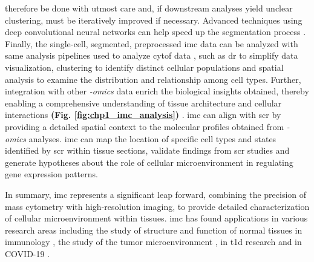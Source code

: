 therefore be done with utmost care and, if downstream analyses yield unclear clustering, must be iteratively improved if necessary. Advanced techniques using deep convolutional neural networks can help speed up the segmentation process \textbf{\cite{jung_automatic_2019,fujita_cell_2021}}. Finally, the single-cell, segmented, preprocessed \gls{imc} data can be analyzed with same analysis pipelines used to analyze \gls{cytof} data \textbf{\cite{veenstra_research_2021}}, such as \gls{dr} to simplify data visualization, clustering to identify distinct cellular populations and spatial analysis to examine the distribution and relationship among cell types. Further, integration with other \textit{-omics} data enrich the biological insights obtained, thereby enabling a comprehensive understanding of tissue architecture and cellular interactions \textbf{(Fig. \ref{fig:chp1_imc_analysis})} \textbf{\cite{veenstra_research_2021}}. \gls{imc} can align with \gls{scr} by providing a detailed spatial context to the molecular profiles obtained from \textit{-omics} analyses. \gls{imc} can map the location of specific cell types and states identified by \gls{scr} within tissue sections, validate findings from \gls{scr} studies and generate hypotheses about the role of cellular microenvironment in regulating gene expression patterns.\\



\par In summary, \gls{imc} represents a significant leap forward, combining the precision of mass cytometry with high-resolution imaging, to provide detailed characterization of cellular microenvironment within tissues. \gls{imc} has found applications in various research areas including the study of structure and function of normal tissues \textbf{\cite{chang_imaging_2017}} in immunology \textbf{\cite{zhao_spatiotemporal_2018,li_memory_2019}}, the study of the tumor microenvironment \textbf{\cite{jackson_single-cell_2020,moldoveanu_spatially_2022}}, in \gls{t1d} research \textbf{\cite{damond_map_2019,wang_multiplexed_2019}} and in COVID-19 \textbf{\cite{wang_imaging_2020}}.